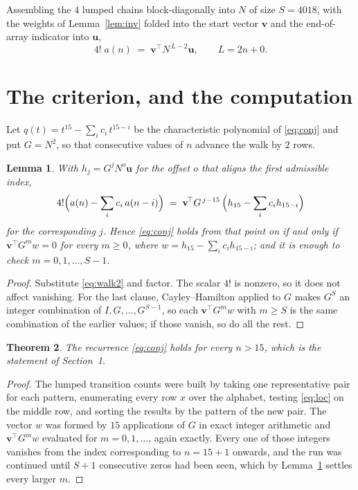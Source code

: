 \documentclass[11pt,a4paper]{article}
\theoremstyle{plain}
\newtheorem{theorem}{Theorem}
\newtheorem{lemma}[theorem]{Lemma}
\theoremstyle{definition}
\begin{document}
Assembling the $4$ lumped chains block-diagonally into $N$ of size $S=4018$, with the
weights of Lemma~\ref{lem:inv} folded into the start vector $\mathbf{v}$ and the
end-of-array indicator into $\mathbf{u}$,
\begin{equation}\label{eq:walk2}
4!\;a(n)\;=\;\mathbf{v}^{\!\top}N^{\,L-2}\mathbf{u},\qquad L=2n+0 .
\end{equation}

\section{The criterion, and the computation}

Let $q(t)=t^{15}-\sum_i c_i\,t^{15-i}$ be the characteristic polynomial of
\eqref{eq:conj} and put $G=N^{2}$, so that consecutive values of $n$ advance the
walk by $2$ rows.

\begin{lemma}\label{lem:crit}
With $h_j=G^{j}N^{o}\mathbf{u}$ for the offset $o$ that aligns the first admissible
index,
\[
4!\Bigl(a(n)-\sum_i c_i\,a(n-i)\Bigr)\;=\;\mathbf{v}^{\!\top}G^{\,j-15}\,
\Bigl(h_{15}-\sum_i c_i h_{15-i}\Bigr)
\]
for the corresponding $j$. Hence \eqref{eq:conj} holds from that point on if and only if
$\mathbf{v}^{\!\top}G^{m}w=0$ for every $m\ge0$, where
$w=h_{15}-\sum_i c_ih_{15-i}$; and it is enough to check $m=0,1,\dots,S-1$.
\end{lemma}

\begin{proof}
Substitute \eqref{eq:walk2} and factor. The scalar $4!$ is nonzero, so it does not
affect vanishing. For the last clause, Cayley--Hamilton applied to $G$ makes $G^{S}$ an
integer combination of $I,G,\dots,G^{S-1}$, so each $\mathbf{v}^{\!\top}G^{m}w$ with
$m\ge S$ is the same combination of the earlier values; if those vanish, so do all the rest.
\end{proof}

\begin{theorem}
The recurrence \eqref{eq:conj} holds for every $n>15$, which is the statement of
Section~1.
\end{theorem}

\begin{proof}
The lumped transition counts were built by taking one representative pair for each pattern,
enumerating every row $x$ over the alphabet, testing \eqref{eq:loc} on the middle
row, and sorting the results by the pattern of the new pair. The vector $w$ was formed by
$15$ applications of $G$ in exact integer arithmetic and $\mathbf{v}^{\!\top}G^{m}w$
evaluated for $m=0,1,\dots$, again exactly. Every one of those integers vanishes from the
index corresponding to $n=15+1$ onwards, and the run was continued until $S+1$
consecutive zeros had been seen, which by Lemma~\ref{lem:crit} settles every larger $m$.
\end{proof}
\end{document}
